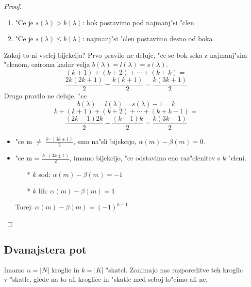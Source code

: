 \documentclass[a4paper,12pt]{article}
\theoremstyle{definition}
\theoremstyle{remark}
\begin{document}
\begin{proof}
	\begin{enumerate}
	    \item "Ce je $s(\lambda) > b(\lambda)$: bok postavimo pod najmanj"si "clen
	    \item "Ce je $s(\lambda) \leqslant b(\lambda)$: najmanj"si "clen postavimo desno od boka
	\end{enumerate}

	Zakaj to ni vselej bijekcija? \label{TODO: add image 5} Prvo pravilo ne deluje, "ce se bok seka z najmanj"sim "clenom, oziroma kadar velja $b(\lambda) = l(\lambda) = s(\lambda)$.
	\label{TODO: add image 6}
	\[(k + 1) + (k + 2) + \cdots + (k + k) =\]
	\[\frac{2k (2k + 1)}{2} - \frac{k (k + 1)}{2} = \frac{k (3k + 1)}{2}\]
	Drugo pravilo ne deluje, "ce
	\[b(\lambda) = l(\lambda) = s(\lambda) - 1 = k\]
	\label{TODO: add image 7}
	\[k + (k + 1) + (k + 2) + \cdots + (k + k - 1) =\]
	\[\frac{(2k - 1) 2k}{2} - \frac{(k - 1) k}{2} = \frac{k (3k - 1)}{2}\]

	\begin{itemize}
	    \item "ce m $\neq$ $\frac{k \cdot (3k \pm 1)}{2}$, smo na"sli bijekcijo, $\alpha(m) - \beta(m) = 0$.
	    \item "ce m = $\frac{k \cdot (3k \pm 1)}{2}$, imamo bijekcijo, "ce odstavimo eno raz"clenitev s $k$ "cleni.
	    \begin{itemize}
	    	\item[*] $k$ sod: $\alpha(m) - \beta(m) = -1$
		    \item[*] $k$ lih: $\alpha(m) - \beta(m) = 1$
		\end{itemize}
	    Torej: $\alpha(m) - \beta(m) = (-1)^{k - 1}$
	\end{itemize}
\end{proof}
\label{TODO: add image 8}

\subsection{Dvanajstera pot}
Imamo $n = |N|$ kroglic in $k = |K|$ "skatel. Zanimajo nas razporeditve teh kroglic v "skatle, glede na to ali kroglice in "skatle med seboj lo"cimo ali ne.
\end{document}
